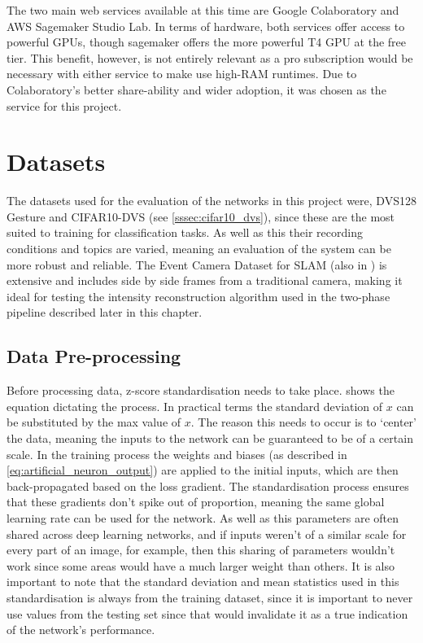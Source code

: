 The two main web services available at this time are Google Colaboratory\cite{GoogleColab} and AWS Sagemaker Studio Lab\cite{AwsSagemaker}. In terms of hardware, both services offer access to powerful GPUs, though sagemaker offers the more powerful T4 GPU at the free tier. This benefit, however, is not entirely relevant as a pro subscription would be necessary with either service to make use high-RAM runtimes. Due to Colaboratory's better share-ability and wider adoption, it was chosen as the service for this project.

\section{Datasets}

The datasets used for the evaluation of the networks in this project were, DVS128 Gesture and CIFAR10-DVS (see \cref{sssec:cifar10_dvs}), since these are the most suited to training for classification tasks. As well as this their recording conditions and topics are varied, meaning an evaluation of the system can be more robust and reliable. The Event Camera Dataset for SLAM (also in ) is extensive and includes side by side frames from a traditional camera, making it ideal for testing the intensity reconstruction algorithm used in the two-phase pipeline described later in this chapter.

\subsection{Data Pre-processing} \label{ssec:data_preprocessing_design}

Before processing data, z-score standardisation needs to take place.  shows the equation dictating the process. In practical terms the standard deviation of $ x $ can be substituted by the max value of $ x $. The reason this needs to occur is to `center' the data, meaning the inputs to the network can be guaranteed to be of a certain scale. In the training process the weights and biases (as described in \cref{eq:artificial_neuron_output}) are applied to the initial inputs, which are then back-propagated based on the loss gradient. The standardisation process ensures that these gradients don't spike out of proportion, meaning the same global learning rate can be used for the network. As well as this parameters are often shared across deep learning networks, and if inputs weren't of a similar scale for every part of an image, for example, then this sharing of parameters wouldn't work since some areas would have a much larger weight than others. It is also important to note that the standard deviation and mean statistics used in this standardisation is always from the training dataset, since it is important to never use values from the testing set since that would invalidate it as a true indication of the network's performance.

